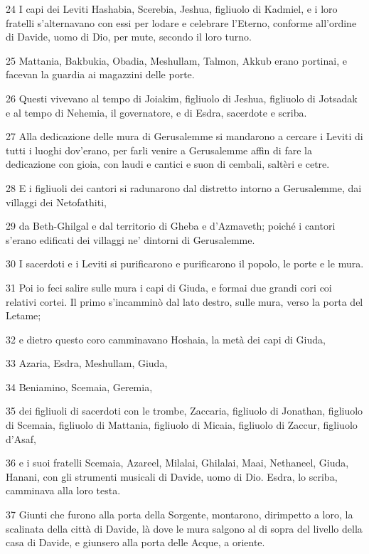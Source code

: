 \par 24 I capi dei Leviti Hashabia, Scerebia, Jeshua, figliuolo di Kadmiel, e i loro fratelli s'alternavano con essi per lodare e celebrare l'Eterno, conforme all'ordine di Davide, uomo di Dio, per mute, secondo il loro turno.
\par 25 Mattania, Bakbukia, Obadia, Meshullam, Talmon, Akkub erano portinai, e facevan la guardia ai magazzini delle porte.
\par 26 Questi vivevano al tempo di Joiakim, figliuolo di Jeshua, figliuolo di Jotsadak e al tempo di Nehemia, il governatore, e di Esdra, sacerdote e scriba.
\par 27 Alla dedicazione delle mura di Gerusalemme si mandarono a cercare i Leviti di tutti i luoghi dov'erano, per farli venire a Gerusalemme affin di fare la dedicazione con gioia, con laudi e cantici e suon di cembali, saltèri e cetre.
\par 28 E i figliuoli dei cantori si radunarono dal distretto intorno a Gerusalemme, dai villaggi dei Netofathiti,
\par 29 da Beth-Ghilgal e dal territorio di Gheba e d'Azmaveth; poiché i cantori s'erano edificati dei villaggi ne' dintorni di Gerusalemme.
\par 30 I sacerdoti e i Leviti si purificarono e purificarono il popolo, le porte e le mura.
\par 31 Poi io feci salire sulle mura i capi di Giuda, e formai due grandi cori coi relativi cortei. Il primo s'incamminò dal lato destro, sulle mura, verso la porta del Letame;
\par 32 e dietro questo coro camminavano Hoshaia, la metà dei capi di Giuda,
\par 33 Azaria, Esdra, Meshullam, Giuda,
\par 34 Beniamino, Scemaia, Geremia,
\par 35 dei figliuoli di sacerdoti con le trombe, Zaccaria, figliuolo di Jonathan, figliuolo di Scemaia, figliuolo di Mattania, figliuolo di Micaia, figliuolo di Zaccur, figliuolo d'Asaf,
\par 36 e i suoi fratelli Scemaia, Azareel, Milalai, Ghilalai, Maai, Nethaneel, Giuda, Hanani, con gli strumenti musicali di Davide, uomo di Dio. Esdra, lo scriba, camminava alla loro testa.
\par 37 Giunti che furono alla porta della Sorgente, montarono, dirimpetto a loro, la scalinata della città di Davide, là dove le mura salgono al di sopra del livello della casa di Davide, e giunsero alla porta delle Acque, a oriente.
